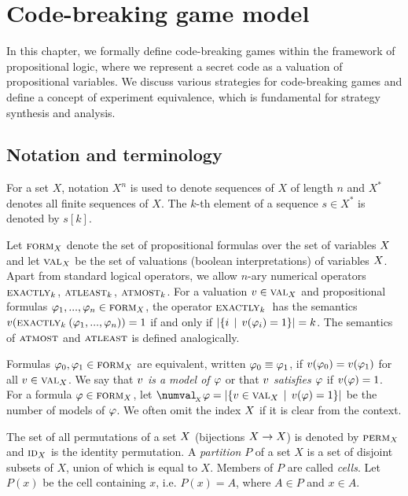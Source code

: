 \chapter{Code-breaking game model} \label{ch:model}

In this chapter, we formally define code-breaking games
  within the framework of propositional logic,
  where we represent a secret code as a valuation
  of propositional variables.
We discuss various strategies for code-breaking games and
  define a concept of experiment equivalence,
  which is fundamental for strategy synthesis and analysis.

\section{Notation and terminology}
For a set $X$, notation $X^n$ is used to denote sequences of $X$ of length $n$
  and $X^*$ denotes all finite sequences of $X$.
The $k$-th element of a sequence $s \in X^*$ is denoted by $s[k]$.

Let $\textsc{form}_X$ denote the set of propositional formulas over
  the set of variables $X$ and let
  $\textsc{val}_X$ be the set of valuations (boolean interpretations)
  of variables $X$.
Apart from standard logical operators, we allow $n$-ary numerical operators
  $\textsc{exactly}_{k}\:\!$, $\textsc{atleast}_{k}\:\!$, $\textsc{atmost}_{k}\:\!$.
For a valuation $v\in\textsc{val}_X$ and propositional formulas
  $\varphi_1, ...,\varphi_n\in\textsc{form}_X$,
  the operator $\textsc{exactly}_{k}\:$ has the semantics
  $v(\textsc{exactly}_{k}\:(\varphi_1,...,\varphi_n)) = 1$ if and only if
  $|\{i \:\:|\:\: v(\varphi_i) = 1 \}| = k$.
The semantics of $\textsc{atmost}$ and $\textsc{atleast}$ is defined analogically.

Formulas $\varphi_0, \varphi_1 \in \textsc{form}_X$ are equivalent,
  written $\varphi_0 \equiv \varphi_1$, if
  $v(\varphi_0) = v(\varphi_1)$ for all $v\in\textsc{val}_X$.
We say that \emph{$v$ is a model of $\varphi$}
  or that \emph{$v$ satisfies $\varphi$}
  if $v(\varphi) = 1$.
For a formula $\varphi\in\textsc{form}_X$, let
  $\numval_{\!_\Var}{\form} = |\{ \val\in\Val_\Var \| \val(\form) = 1 \}|$
  be the number of models of $\varphi$.
We often omit the index $X$ if it is clear from the context.

The set of all permutations of a set $X$ (bijections $X->X$)
  is denoted by $\textsc{perm}_X$ and
  $\textsc{id}_X$ is the identity permutation.
A \emph{partition} $P$ of a set $X$ is a set of disjoint subsets of $X$,
  union of which is equal to $X$.
Members of $P$ are called \emph{cells}.
Let $P(x)$ be the cell containing $x$,
  i.e. $P(x) = A$, where $A\in P$ and $x\in A$.

